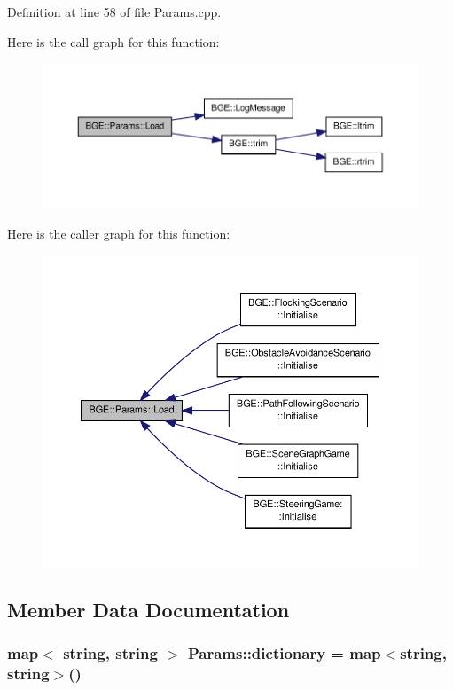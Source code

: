 Definition at line 58 of file Params.\-cpp.



Here is the call graph for this function\-:
\nopagebreak
\begin{figure}[H]
\begin{center}
\leavevmode
\includegraphics[width=350pt]{class_b_g_e_1_1_params_a2d35020b3044c27ff1b92d4f9d400d2f_cgraph}
\end{center}
\end{figure}




Here is the caller graph for this function\-:
\nopagebreak
\begin{figure}[H]
\begin{center}
\leavevmode
\includegraphics[width=350pt]{class_b_g_e_1_1_params_a2d35020b3044c27ff1b92d4f9d400d2f_icgraph}
\end{center}
\end{figure}




\subsection{Member Data Documentation}
\hypertarget{class_b_g_e_1_1_params_ae9a80b263bbb021c083f034f9126cdbb}{
\subsubsection[{dictionary}]{\setlength{\rightskip}{0pt plus 5cm}map$<$ string, string $>$ Params\-::dictionary = map$<$string, string$>$()\hspace{0.3cm}{\ttfamily [static]}}}\label{class_b_g_e_1_1_params_ae9a80b263bbb021c083f034f9126cdbb}


